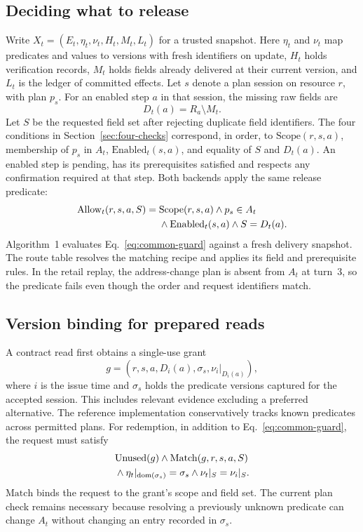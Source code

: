 \subsection{Deciding what to release}
Write $X_t=(E_t,\eta_t,\nu_t,H_t,M_t,L_t)$ for a trusted snapshot. Here $\eta_t$ and $\nu_t$ map predicates and values to versions with fresh identifiers on update, $H_t$ holds verification records, $M_t$ holds fields already delivered at their current version, and $L_t$ is the ledger of committed effects. Let $s$ denote a plan session on resource $r$, with plan $p_s$. For an enabled step $a$ in that session, the missing raw fields are
\begin{equation}
D_t(a)=R_a\setminus M_t.\label{eq:missing}
\end{equation}
Let $S$ be the requested field set after rejecting duplicate field identifiers. The four conditions in Section~\ref{sec:four-checks} correspond, in order, to $\mathrm{Scope}(r,s,a)$, membership of $p_s$ in $A_t$, $\mathrm{Enabled}_t(s,a)$, and equality of $S$ and $D_t(a)$. An enabled step is pending, has its prerequisites satisfied and respects any confirmation required at that step. Both backends apply the same release predicate:
\begin{align}
\mathrm{Allow}_t(r,s,a,S)={}&
\mathrm{Scope}(r,s,a) \land p_s\in A_t \notag\\
 &{}\land\mathrm{Enabled}_t(s,a)
 \land S=D_t(a).\label{eq:common-guard}
\end{align}
Algorithm~1 evaluates Eq.~\eqref{eq:common-guard} against a fresh delivery snapshot. The route table resolves the matching recipe and applies its field and prerequisite rules. In the retail replay, the address-change plan is absent from $A_t$ at turn~3, so the predicate fails even though the order and request identifiers match.

\subsection{Version binding for prepared reads}
A contract read first obtains a single-use grant
\begin{equation}
g=(r,s,a,D_i(a),\sigma_s,\nu_i|_{D_i(a)}),\label{eq:grant}
\end{equation}
where $i$ is the issue time and $\sigma_s$ holds the predicate versions captured for the accepted session. This includes relevant evidence excluding a preferred alternative. The reference implementation conservatively tracks known predicates across permitted plans. For redemption, in addition to Eq.~\eqref{eq:common-guard}, the request must satisfy
\begin{align}
 &\mathrm{Unused}(g)\land\mathrm{Match}(g,r,s,a,S)\notag\\
 &{}\land\eta_t|_{\mathrm{dom}(\sigma_s)}=\sigma_s
 \land\nu_t|_S=\nu_i|_S .\label{eq:grant-valid}
\end{align}
$\mathrm{Match}$ binds the request to the grant's scope and field set. The current plan check remains necessary because resolving a previously unknown predicate can change $A_t$ without changing an entry recorded in $\sigma_s$.

